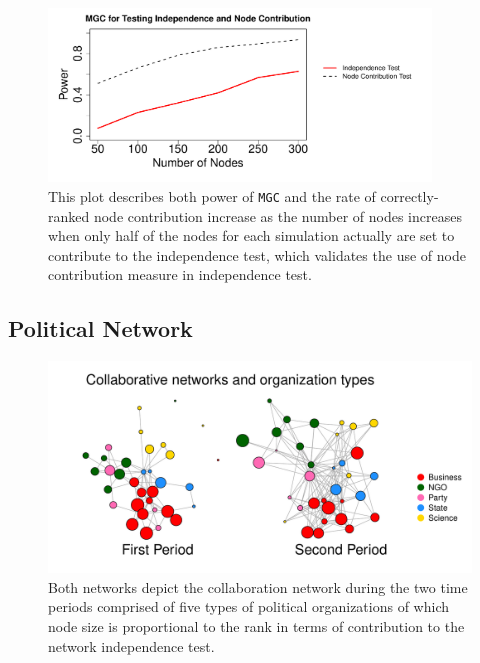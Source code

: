 \documentclass[12pt]{article}
\begin{document}
\begin{figure}
	\centering
	\includegraphics[width=4in]{../Figure/nodecontri.pdf}
	\caption{This plot describes both power of \texttt{MGC} and the rate of correctly-ranked node contribution increase as the number of nodes increases when only half of the nodes for each simulation actually are set to contribute to the independence test, which validates the use of node contribution measure in independence test.}
	\label{fig:contribution}
\end{figure}


\subsection*{Political Network}

\begin{figure}[H]
	\centering
	\includegraphics[width=6in]{../Figure/two_politics.pdf}
	\caption{Both networks depict the collaboration network  during the two time periods  comprised of five types of political organizations of which node size is proportional to the rank in terms of contribution to the network independence test.}
	\label{fig:politics}
\end{figure}
\end{document}
